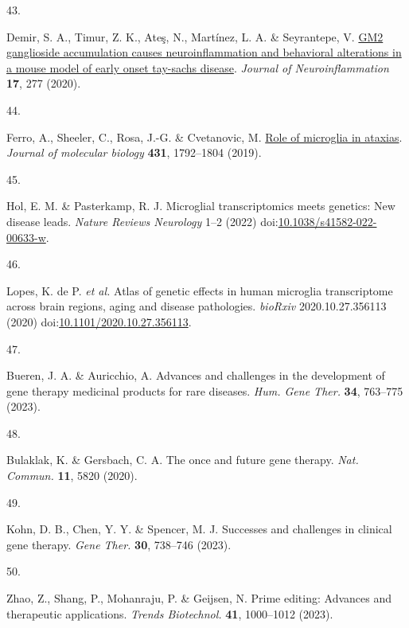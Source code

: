 \documentclass[
]{article}
\newlength{\cslhangindent}
\newlength{\csllabelwidth}
\newenvironment{CSLReferences}[2] %
 {\begin{list}{}{%
  \setlength{\itemindent}{0pt}
  \setlength{\leftmargin}{0pt}
  \setlength{\parsep}{0pt}
  \ifodd #1
   \setlength{\leftmargin}{\cslhangindent}
   \setlength{\itemindent}{-1\cslhangindent}
  \fi
  \setlength{\itemsep}{#2\baselineskip}}}
 {\end{list}}
\newcommand{\CSLLeftMargin}[1]{\parbox[t]{\csllabelwidth}{\strut#1\strut}}
\newcommand{\CSLRightInline}[1]{\parbox[t]{\linewidth - \csllabelwidth}{\strut#1\strut}}
\begin{document}
\begin{CSLReferences}{0}{0}
\CSLLeftMargin{43. }%
\CSLRightInline{Demir, S. A., Timur, Z. K., Ateş, N., Martínez, L. A. \&
Seyrantepe, V. \href{https://doi.org/10.1186/s12974-020-01947-6}{GM2
ganglioside accumulation causes neuroinflammation and behavioral
alterations in a mouse model of early onset tay-sachs disease}.
\emph{Journal of Neuroinflammation} \textbf{17}, 277 (2020).}

\CSLLeftMargin{44. }%
\CSLRightInline{Ferro, A., Sheeler, C., Rosa, J.-G. \& Cvetanovic, M.
\href{https://doi.org/10.1016/j.jmb.2019.01.016}{Role of microglia in
ataxias}. \emph{Journal of molecular biology} \textbf{431}, 1792--1804
(2019).}

\CSLLeftMargin{45. }%
\CSLRightInline{Hol, E. M. \& Pasterkamp, R. J. Microglial
transcriptomics meets genetics: New disease leads. \emph{Nature Reviews
Neurology} 1--2 (2022)
doi:\href{https://doi.org/10.1038/s41582-022-00633-w}{10.1038/s41582-022-00633-w}.}

\CSLLeftMargin{46. }%
\CSLRightInline{Lopes, K. de P. \emph{et al.} Atlas of genetic effects
in human microglia transcriptome across brain regions, aging and disease
pathologies. \emph{bioRxiv} 2020.10.27.356113 (2020)
doi:\href{https://doi.org/10.1101/2020.10.27.356113}{10.1101/2020.10.27.356113}.}

\CSLLeftMargin{47. }%
\CSLRightInline{Bueren, J. A. \& Auricchio, A. Advances and challenges
in the development of gene therapy medicinal products for rare diseases.
\emph{Hum. Gene Ther.} \textbf{34}, 763--775 (2023).}

\CSLLeftMargin{48. }%
\CSLRightInline{Bulaklak, K. \& Gersbach, C. A. The once and future gene
therapy. \emph{Nat. Commun.} \textbf{11}, 5820 (2020).}

\CSLLeftMargin{49. }%
\CSLRightInline{Kohn, D. B., Chen, Y. Y. \& Spencer, M. J. Successes and
challenges in clinical gene therapy. \emph{Gene Ther.} \textbf{30},
738--746 (2023).}

\CSLLeftMargin{50. }%
\CSLRightInline{Zhao, Z., Shang, P., Mohanraju, P. \& Geijsen, N. Prime
editing: Advances and therapeutic applications. \emph{Trends
Biotechnol.} \textbf{41}, 1000--1012 (2023).}


\end{CSLReferences}
\end{document}
